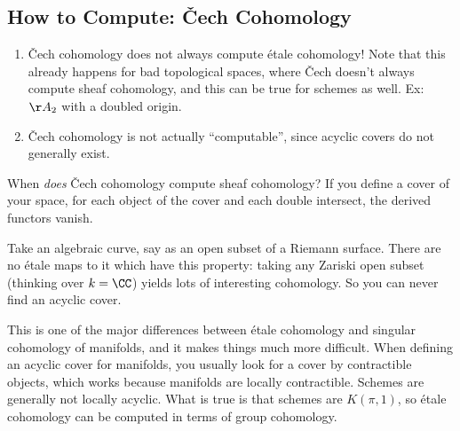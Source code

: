 \hypertarget{how-to-compute-ux10dech-cohomology}{%
\subsection{How to Compute: Čech
Cohomology}\label{how-to-compute-ux10dech-cohomology}}

\begin{warnings}

\envlist

\begin{enumerate}
\def\labelenumi{\arabic{enumi}.}
\item
  Čech cohomology does not always compute étale cohomology! Note that
  this already happens for bad topological spaces, where Čech doesn't
  always compute sheaf cohomology, and this can be true for schemes as
  well. Ex: \(\AA_2\) with a doubled origin.
\item
  Čech cohomology is not actually ``computable'', since acyclic covers
  do not generally exist.
\end{enumerate}

\end{warnings}

When \emph{does} Čech cohomology compute sheaf cohomology? If you define
a cover of your space, for each object of the cover and each double
intersect, the derived functors vanish.

\begin{example}[?]

Take an algebraic curve, say as an open subset of a Riemann surface.
There are no étale maps to it which have this property: taking any
Zariski open subset (thinking over \(k=\CC\)) yields lots of interesting
cohomology. So you can never find an acyclic cover.

\end{example}

\begin{remark}

This is one of the major differences between étale cohomology and
singular cohomology of manifolds, and it makes things much more
difficult. When defining an acyclic cover for manifolds, you usually
look for a cover by contractible objects, which works because manifolds
are locally contractible. Schemes are generally not locally acyclic.
What is true is that schemes are \(K(\pi, 1)\), so étale cohomology can
be computed in terms of group cohomology.

\end{remark}

